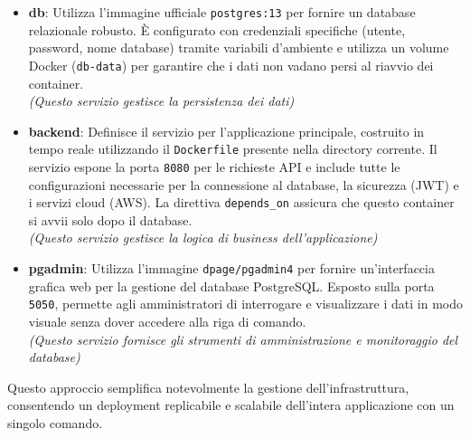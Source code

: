 \begin{itemize}
    \item \textbf{db}: Utilizza l'immagine ufficiale \texttt{postgres:13} per fornire un database relazionale robusto. È configurato con credenziali specifiche (utente, password, nome database) tramite variabili d'ambiente e utilizza un volume Docker (\texttt{db-data}) per garantire che i dati non vadano persi al riavvio dei container.
    \\ \textit{(Questo servizio gestisce la persistenza dei dati)}

    \item \textbf{backend}: Definisce il servizio per l'applicazione principale, costruito in tempo reale utilizzando il \texttt{Dockerfile} presente nella directory corrente. Il servizio espone la porta \texttt{8080} per le richieste API e include tutte le configurazioni necessarie per la connessione al database, la sicurezza (JWT) e i servizi cloud (AWS). La direttiva \texttt{depends\_on} assicura che questo container si avvii solo dopo il database.
    \\ \textit{(Questo servizio gestisce la logica di business dell'applicazione)}

    \item \textbf{pgadmin}: Utilizza l'immagine \texttt{dpage/pgadmin4} per fornire un'interfaccia grafica web per la gestione del database PostgreSQL. Esposto sulla porta \texttt{5050}, permette agli amministratori di interrogare e visualizzare i dati in modo visuale senza dover accedere alla riga di comando.
    \\ \textit{(Questo servizio fornisce gli strumenti di amministrazione e monitoraggio del database)}
\end{itemize}

Questo approccio semplifica notevolmente la gestione dell'infrastruttura, consentendo un deployment replicabile e scalabile dell'intera applicazione con un singolo comando.